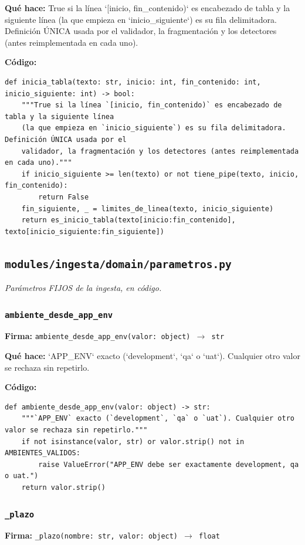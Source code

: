\documentclass[11pt,a4paper]{article}
\begin{document}
\textbf{Qué hace:} True si la línea `[inicio, fin\_contenido)` es encabezado de tabla y la siguiente línea
(la que empieza en `inicio\_siguiente`) es su fila delimitadora. Definición ÚNICA usada por el
validador, la fragmentación y los detectores (antes reimplementada en cada uno).

\textbf{Código:}
\begin{lstlisting}
def inicia_tabla(texto: str, inicio: int, fin_contenido: int, inicio_siguiente: int) -> bool:
    """True si la línea `[inicio, fin_contenido)` es encabezado de tabla y la siguiente línea
    (la que empieza en `inicio_siguiente`) es su fila delimitadora. Definición ÚNICA usada por el
    validador, la fragmentación y los detectores (antes reimplementada en cada uno)."""
    if inicio_siguiente >= len(texto) or not tiene_pipe(texto, inicio, fin_contenido):
        return False
    fin_siguiente, _ = limites_de_linea(texto, inicio_siguiente)
    return es_inicio_tabla(texto[inicio:fin_contenido], texto[inicio_siguiente:fin_siguiente])
\end{lstlisting}

\subsection{\texttt{modules/ingesta/domain/parametros.py}}
\textit{Parámetros FIJOS de la ingesta, en código.}

\subsubsection*{\texttt{ambiente\_desde\_app\_env}}
\textbf{Firma:} \texttt{ambiente\_desde\_app\_env(valor: object) $\rightarrow$ str}

\textbf{Qué hace:} `APP\_ENV` exacto (`development`, `qa` o `uat`). Cualquier otro valor se rechaza sin repetirlo.

\textbf{Código:}
\begin{lstlisting}
def ambiente_desde_app_env(valor: object) -> str:
    """`APP_ENV` exacto (`development`, `qa` o `uat`). Cualquier otro valor se rechaza sin repetirlo."""
    if not isinstance(valor, str) or valor.strip() not in AMBIENTES_VALIDOS:
        raise ValueError("APP_ENV debe ser exactamente development, qa o uat.")
    return valor.strip()
\end{lstlisting}

\subsubsection*{\texttt{\_plazo}}
\textbf{Firma:} \texttt{\_plazo(nombre: str, valor: object) $\rightarrow$ float}
\end{document}
